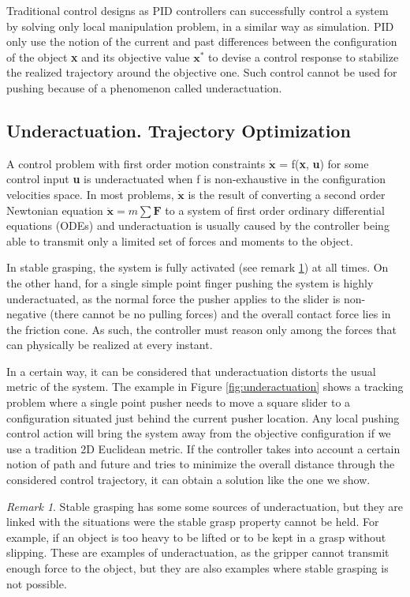 \documentclass[12,twoside]{TFG-GM}
\theoremstyle{definition}
\theoremstyle{remark}
\newtheorem{remark}[theorem]{Remark}
\begin{document}
Traditional control designs as PID controllers can successfully control a system by solving only local manipulation problem, in a similar way as simulation. PID only use the notion of the current and past differences between the configuration of the object \textbf{x} and its objective value $\textbf{x}^*$ to devise a control response to stabilize the realized trajectory around the objective one. Such control cannot be used for pushing because of a phenomenon called underactuation.

\label{sec:hybridness}
\subsection{Underactuation. Trajectory Optimization}

A control problem with first order motion constraints $\dot{\textbf{x}}$ = f({\textbf{x}, \textbf{u}}) for some control input \textbf{u} is underactuated when f is non-exhaustive in the configuration velocities space. In most problems, $\dot{\textbf{x}}$ is the result of converting a second order Newtonian equation $\ddot{\textbf{x}} = m\sum \textbf{F}$ to a system of first order ordinary differential equations (ODEs) and underactuation is usually caused by the controller being able to transmit only a limited set of forces and moments to the object.
 
In stable grasping, the system is fully activated (see remark \ref{rem:underactuation}) at all times. On the other hand, for a single simple point finger pushing the system is highly underactuated, as the normal force the pusher applies to the slider is non-negative (there cannot be no pulling forces) and the overall contact force lies in the friction cone. As such, the controller must reason only among the forces that can physically be realized at every instant.

In a certain way, it can be considered that underactuation distorts the usual metric of the system. The example in Figure \ref{fig:underactuation} shows a tracking problem where a single point pusher needs to move a square slider to a configuration situated just behind the current pusher location. Any local pushing control action will bring the system away from the objective configuration if we use a tradition 2D Euclidean metric. If the controller takes into account a certain notion of path and future and tries to minimize the overall distance through the considered control trajectory, it can obtain a solution like the one we show.

\begin{remark} \label{rem:underactuation}
Stable grasping has some some sources of underactuation, but they are linked with the situations were the stable grasp property cannot be held. For example, if an object is too heavy to be lifted or to be kept in a grasp without slipping. These are examples of underactuation, as the gripper cannot transmit enough force to the object, but they are also examples where stable grasping is not possible.
\end{remark}
\end{document}
